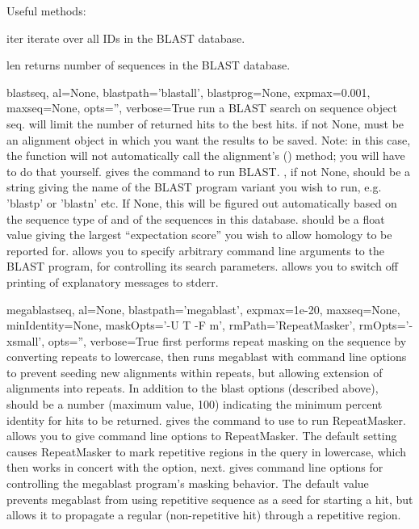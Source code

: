 \documentclass{howto}
\begin{document}
Useful methods:

\begin{funcdesc}{iter}{}
  iterate over all IDs in the BLAST database.
\end{funcdesc}

\begin{funcdesc}{len}{}
  returns number of sequences in the BLAST database.
\end{funcdesc}

\begin{funcdesc}{blast}{seq, al=None, blastpath='blastall', blastprog=None, expmax=0.001,
maxseq=None, opts='', verbose=True}
  run a BLAST search on sequence object seq.
   will limit the number of returned hits to the best  hits. 
   if not None, must be an alignment object in which you want the results
  to be saved.  Note: in this case, the  function will not automatically
  call the alignment's () method; you will have to do that yourself.
   gives the command to run BLAST.
  , if not None, should be a string giving the name of the BLAST
  program variant you wish to run, e.g. 'blastp' or 'blastn' etc.  If None,
  this will be figured out automatically based on the sequence type of 
  and of the sequences in this database.
   should be a float value giving the largest ``expectation score''
  you wish to allow homology to be reported for.
   allows you to specify arbitrary command line arguments to the BLAST
  program, for controlling its search parameters.
   allows you to switch off printing of explanatory messages to 
  stderr.
\end{funcdesc}

\begin{funcdesc}{megablast}{seq, al=None, blastpath='megablast', expmax=1e-20,
maxseq=None, minIdentity=None, maskOpts='-U T -F m',
rmPath='RepeatMasker', rmOpts='-xsmall', opts='', verbose=True}
  first performs repeat masking on the sequence by converting repeats to lowercase,
  then runs megablast with command line options to prevent seeding new alignments
  within repeats, but allowing extension of alignments into repeats.
  In addition to the blast options (described above),
   should be a number (maximum value, 100)
  indicating the minimum percent identity for hits to be returned.
   gives the command to use to run RepeatMasker.
   allows you to give command line options to RepeatMasker.
  The default setting causes RepeatMasker to mark repetitive regions in the
  query in lowercase, which then works in concert with the  option, next.
   gives command line options for controlling the megablast program's
  masking behavior.  The default value prevents megablast from using repetitive
  sequence as a seed for starting a hit, but allows it to propagate a regular
  (non-repetitive hit) through a repetitive region.
\end{funcdesc}
\end{document}
